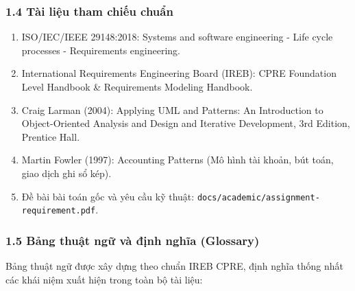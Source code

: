\documentclass[11pt,a4paper]{article}
\providecommand{\tightlist}{
  \setlength{\itemsep}{0pt}\setlength{\parskip}{0pt}}
\begin{document}
\subsubsection{1.4 Tài liệu tham chiếu
chuẩn}\label{14-tuxe0i-liux1ec7u-tham-chiux1ebfu-chuux1ea9n}

\begin{enumerate}
\def\labelenumi{\arabic{enumi}.}
\tightlist
\item
  ISO/IEC/IEEE 29148:2018: Systems and software engineering - Life cycle
  processes - Requirements engineering.
\item
  International Requirements Engineering Board (IREB): CPRE Foundation
  Level Handbook \& Requirements Modeling Handbook.
\item
  Craig Larman (2004): Applying UML and Patterns: An Introduction to
  Object-Oriented Analysis and Design and Iterative Development, 3rd
  Edition, Prentice Hall.
\item
  Martin Fowler (1997): Accounting Patterns (Mô hình tài khoản, bút
  toán, giao dịch ghi sổ kép).
\item
  Đề bài bài toán gốc và yêu cầu kỹ thuật:
  \texttt{docs/academic/assignment-requirement.pdf}.
\end{enumerate}

\subsubsection{1.5 Bảng thuật ngữ và định nghĩa
(Glossary)}\label{15-bux1ea3ng-thuux1eadt-ngux1eef-vuxe0-ux111ux1ecbnh-nghux129a-glossary}

Bảng thuật ngữ được xây dựng theo chuẩn IREB CPRE, định nghĩa thống nhất
các khái niệm xuất hiện trong toàn bộ tài liệu:
\end{document}
